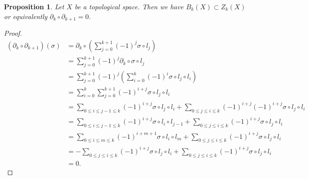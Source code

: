 \documentclass{report}
\newtheorem{proposition}{Proposition}[section]
\theoremstyle{nonumberplain}
\newtheorem{proof}{Proof.}
\begin{document}
\begin{proposition}
	Let $X$ be a topological space. Then we have $B_k(X)\subset Z_k(X)$ or equivalently $\partial_k\circ\partial_{k+1}=0$.
\end{proposition}
\begin{proof}
	\[
	\begin{aligned}
		\left(\partial_k\circ\partial_{k+1}\right)(\sigma)&=\partial_{k}\circ\left(\sum_{j=0}^{k+1}(-1)^{j}\sigma\circ l_j\right)\\
		&=\sum_{j=0}^{k+1}(-1)^{j}\partial_{k}\circ\sigma\circ l_j\\
		&=\sum_{j=0}^{k+1}(-1)^{j}\left(\sum_{i=0}^k(-1)^{i}\sigma\circ l_j\circ l_i\right)\\
		&=\sum_{i=0}^{k}\sum_{j=0}^{k+1}(-1)^{i+j}\sigma\circ l_j\circ l_i\\
		&=\sum_{0\le i\le j-1\le k}(-1)^{i+j}\sigma\circ l_j\circ l_i+\sum_{0\le j\le i\le k}(-1)^{i+j}(-1)^{i+j}\sigma\circ l_j\circ l_i\\
		&=\sum_{0\le i\le j-1\le k}(-1)^{i+j}\sigma\circ l_i\circ l_{j-1}+\sum_{0\le j\le i\le k}(-1)^{i+j}\sigma\circ l_j\circ l_i\\
		&=\sum_{0\le i\le m\le k}(-1)^{i+m+1}\sigma\circ l_i\circ l_{m}+\sum_{0\le j\le i\le k}(-1)^{i+j}\sigma\circ l_j\circ l_i\\
		&=-\sum_{0\le j\le i\le k}(-1)^{i+j}\sigma\circ l_j\circ l_{i}+\sum_{0\le j\le i\le k}(-1)^{i+j}\sigma\circ l_j\circ l_i\\
		&=0.
	\end{aligned}
	\]
\end{proof}
\end{document}
